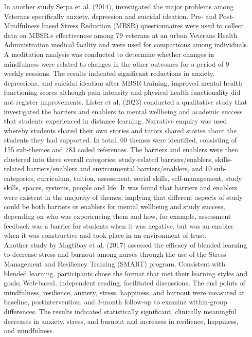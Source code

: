 \documentclass[12pt]{article}
\begin{document}
\noindent In another study Serpa et al. (2014), investigated the major problems among Veterans specifically anxiety, depression and suicidal ideation. Pre- and Post-Mindfulness based Stress Reduction (MBSR) questionnaires were used to collect data on MBSR.s effectiveness among 79 veterans at an urban Veterans Health Administration medical facility and were used for comparisons among individuals. A meditation analysis was conducted to determine whether changes in mindfulness were related to changes in the other outcomes for a period of 9 weekly sessions. The results indicated significant reductions in anxiety, depressions, and suicidal ideation after MBSR training, improved mental health functioning scores although pain intensity and physical health functionality did not register improvements. Lister et al. (2023) conducted a qualitative study that investigated the  barriers and enablers to mental wellbeing and academic success that students experienced in distance learning. Narrative enquiry was used whereby students shared their own stories and tutors shared stories about the students they had supported.
In total, 60 themes were identified, consisting of 155 sub-themes and 783 coded
references. The barriers and enablers were then clustered into three overall categories;
study-related barriers/enablers, skills-related barriers/enablers and environmental barriers/enablers, and 10 sub-categories, curriculum, tuition, assessment, social skills, self-management, study skills, spaces, systems, people and life. It was found that barriers and enablers were existent in the majority of themes, implying that different aspects of study could be both barriers or enablers for mental wellbeing and study success, depending on who was experiencing them and how, for example, assessment feedback was a barrier for students when it was negative, but was an enabler when it was constructive and took place in an environment
of trust.\\

\noindent Another study by Magtibay et al. (2017) assessed the efficacy of blended learning to decrease stress and burnout among nurses through the use of the Stress Management and Resiliency Training (SMART) program. Consistent with blended learning, participants chose the format that met their learning styles and goals; Web-based, independent reading, facilitated discussions. The end points of mindfulness, resilience, anxiety, stress, happiness, and burnout were measured at baseline, postintervention, and 3-month follow-up to examine within-group differences. The results indicated statistically significant, clinically meaningful decreases in anxiety, stress, and burnout and increases in resilience, happiness, and mindfulness. \\
\end{document}
